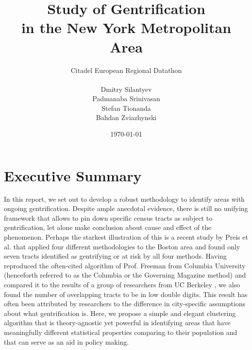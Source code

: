 \documentclass[a4paper, 12pt]{article}
\numberwithin{equation}{section}
\begin{document}
	
	\title{Study of Gentrification \\ in the New York Metropolitan Area}
	\author{Citadel European Regional Datathon \\
		\\
		Dmitry Silantyev \\
		Padmanaba Srinivasan \\
		Stefan Tionanda \\
		Bahdan Zviazhynski \\
	} 
	\date{\today}
	\maketitle
	
	\tableofcontents
	\newpage
	
	\section{Executive Summary}
			
		In this report, we set out to develop a robust methodology to identify areas with ongoing gentrification. Despite ample anecdotal evidence, there is still no unifying framework that allows to pin down specific census tracts as subject to gentrification, let alone make conclusion about cause and effect of the phenomenon. Perhaps the starkest illustration of this is a recent study by Preis et al. \cite{Preis20} that applied four different methodologies to the Boston area and found only seven tracts identified as gentrifying or at risk by all four methods. Having reproduced the often-cited algorithm of Prof. Freeman from Columbia University \cite{Freeman05} (henceforth referred to as the Columbia or the Governing Magazine method) and compared it to the results of a group of researchers from UC Berkeley \cite{Chapple17}, we also found the number of overlapping tracts to be in low double digits. This result has often been attributed by researchers to the difference in city-specific assumptions about what gentrification is. Here, we propose a simple and elegant clustering algorithm that is theory-agnostic yet powerful in identifying areas that have meaningfully different statistical properties comparing to their population and that can serve as an aid in policy making. \\
		
\end{document}
